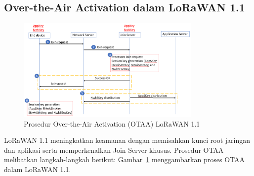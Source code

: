 \subsection{Over-the-Air Activation dalam LoRaWAN 1.1}
\begin{figure}[htbp]
    \centering
    \includegraphics[width=0.8\textwidth]{figures/otaa-1.1.png}
    \caption{Prosedur Over-the-Air Activation (OTAA) LoRaWAN 1.1}
    \label{fig:lora_otaa_1.1}
\end{figure}
LoRaWAN 1.1 meningkatkan keamanan dengan memisahkan kunci root jaringan dan aplikasi serta memperkenalkan Join Server khusus. Prosedur OTAA melibatkan langkah-langkah berikut:
Gambar~\ref{fig:lora_otaa_1.1} menggambarkan proses OTAA dalam LoRaWAN 1.1.
